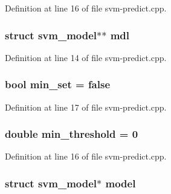Definition at line 16 of file svm-\/predict.\-cpp.

\hypertarget{_2svm-predict_8cpp_a639aa8f86cbf6b9c5d43e0c5082e26ac}{
\subsubsection[{mdl}]{\setlength{\rightskip}{0pt plus 5cm}struct {\bf svm\-\_\-model}$\ast$$\ast$ mdl}}\label{_2svm-predict_8cpp_a639aa8f86cbf6b9c5d43e0c5082e26ac}


Definition at line 14 of file svm-\/predict.\-cpp.

\hypertarget{_2svm-predict_8cpp_aa816fb83dd1b415e1339bb8ddd6cdabc}{
\subsubsection[{min\-\_\-set}]{\setlength{\rightskip}{0pt plus 5cm}bool min\-\_\-set = false}}\label{_2svm-predict_8cpp_aa816fb83dd1b415e1339bb8ddd6cdabc}


Definition at line 17 of file svm-\/predict.\-cpp.

\hypertarget{_2svm-predict_8cpp_a3670388207cf8d0f4f4c9237a1482057}{
\subsubsection[{min\-\_\-threshold}]{\setlength{\rightskip}{0pt plus 5cm}double min\-\_\-threshold = 0}}\label{_2svm-predict_8cpp_a3670388207cf8d0f4f4c9237a1482057}


Definition at line 16 of file svm-\/predict.\-cpp.

\hypertarget{_2svm-predict_8cpp_a50c87b127b14787341e9630f4f5c700a}{
\subsubsection[{model}]{\setlength{\rightskip}{0pt plus 5cm}struct {\bf svm\-\_\-model}$\ast$ model}}\label{_2svm-predict_8cpp_a50c87b127b14787341e9630f4f5c700a}


